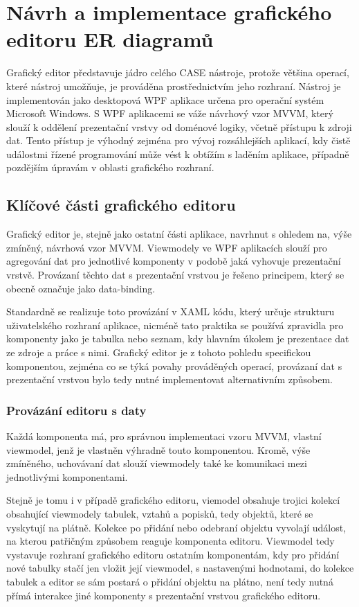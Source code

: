 \documentclass[czech,bachelor,public,dept460,male,oneside]{diploma}
\begin{document}
\newpage
\section{Návrh a implementace grafického editoru ER diagramů}
Grafický editor představuje jádro celého CASE nástroje, protože většina operací, které nástroj umožňuje, je prováděna prostřednictvím jeho rozhraní. Nástroj je implementován jako desktopová WPF aplikace určena pro operační systém Microsoft Windows. S WPF aplikacemi se váže návrhový vzor MVVM, který slouží k oddělení prezentační vrstvy od doménové logiky, včetně přístupu k zdroji dat. Tento přístup je výhodný zejména pro vývoj rozsáhlejších aplikací, kdy čistě událostmi řízené programování může vést k obtížím s laděním aplikace, případně pozdějším úpravám v oblasti grafického rozhraní.
	
	\subsection{Klíčové části grafického editoru}
	Grafický editor je, stejně jako ostatní části aplikace, navrhnut s ohledem na, výše zmíněný, návrhová vzor MVVM. Viewmodely ve WPF aplikacích slouží pro agregování dat pro jednotlivé komponenty v podobě jaká vyhovuje prezentační vrstvě. Provázaní těchto dat s prezentační vrstvou je řešeno principem, který se obecně označuje jako data-binding. 
	
	Standardně se realizuje toto provázání v XAML kódu, který určuje strukturu uživatelského rozhraní aplikace, nicméně tato praktika se používá zpravidla pro komponenty jako je tabulka nebo seznam, kdy hlavním úkolem je prezentace dat ze zdroje a práce s nimi. Grafický editor je z tohoto pohledu specifickou komponentou, zejména co se týká povahy prováděných operací, provázaní dat s prezentační vrstvou bylo tedy nutné implementovat alternativním způsobem. 
		
		\subsubsection{Provázání editoru s daty}
		Každá komponenta má, pro správnou implementaci vzoru MVVM, vlastní viewmodel, jenž je vlastněn výhradně touto komponentou. Kromě, výše zmíněného, uchovávaní dat slouží viewmodely také ke komunikaci mezi jednotlivými komponentami. 
		
		Stejně je tomu i v případě grafického editoru, viemodel obsahuje trojici kolekcí obsahující viewmodely tabulek, vztahů a popisků, tedy objektů, které se vyskytují na plátně. Kolekce po přidání nebo odebraní objektu vyvolají událost, na kterou patřičným způsobem reaguje komponenta editoru. Viewmodel tedy vystavuje rozhraní grafického editoru ostatním komponentám, kdy pro přidání nové tabulky stačí jen vložit její viewmodel, s nastavenými hodnotami, do kolekce tabulek a editor se sám postará o přidání objektu na plátno, není tedy nutná přímá interakce jiné komponenty s prezentační vrstvou grafického editoru.
		
\end{document}
